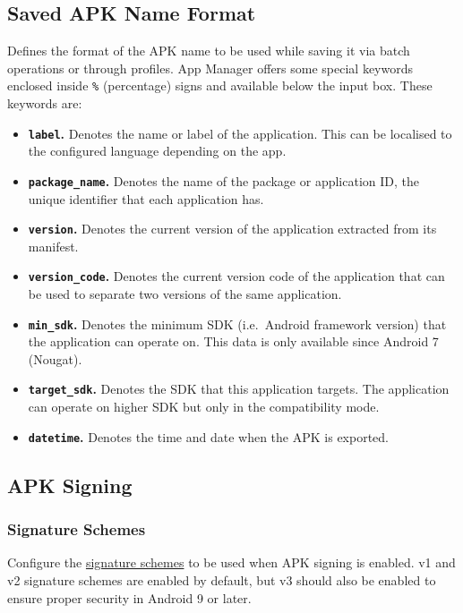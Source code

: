 \subsection{Saved APK Name Format}\label{subsec:saved-apk-name-format} %
Defines the format of the APK name to be used while saving it via batch operations or through profiles.
App Manager offers some special keywords enclosed inside \texttt{\%} (percentage) signs and available below the input box.
These keywords are:
\begin{itemize}
    \item \textbf{\texttt{label}.} Denotes the name or label of the application. This can be localised to the configured language depending on the app.
    \item \textbf{\texttt{package\_name}.} Denotes the name of the package or application ID, the unique identifier that each application has.
    \item \textbf{\texttt{version}.} Denotes the current version of the application extracted from its manifest.
    \item \textbf{\texttt{version\_code}.} Denotes the current version code of the application that can be used to separate two versions of the same application.
    \item \textbf{\texttt{min\_sdk}.} Denotes the minimum SDK (i.e.\ Android framework version) that the application can operate on. This data is only available since Android 7 (Nougat).
    \item \textbf{\texttt{target\_sdk}.} Denotes the SDK that this application targets. The application can operate on higher SDK but only in the compatibility mode.
    \item \textbf{\texttt{datetime}.} Denotes the time and date when the APK is exported.
\end{itemize}

\subsection{APK Signing}\label{subsec:apk-signing} %

\subsubsection{Signature Schemes} %
Configure the \href{https://source.android.com/security/apksigning}{signature schemes} to be used when APK signing is enabled.
v1 and v2 signature schemes are enabled by default, but v3 should also be enabled to ensure proper security in Android 9 or later.

